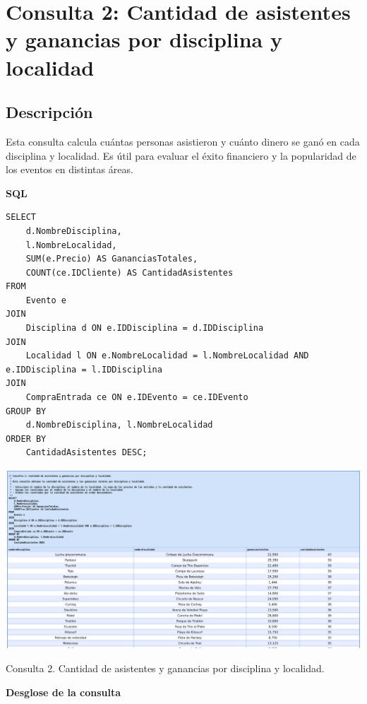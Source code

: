 \section*{Consulta 2: Cantidad de asistentes y ganancias por disciplina y localidad}

\subsection*{Descripción}
Esta consulta calcula cuántas personas asistieron y cuánto dinero se ganó en cada disciplina y localidad. Es útil para evaluar el éxito financiero y la popularidad de los eventos en distintas áreas.

\textbf{SQL}

\begin{verbatim}
SELECT 
    d.NombreDisciplina,
    l.NombreLocalidad,
    SUM(e.Precio) AS GananciasTotales,
    COUNT(ce.IDCliente) AS CantidadAsistentes
FROM 
    Evento e
JOIN 
    Disciplina d ON e.IDDisciplina = d.IDDisciplina
JOIN 
    Localidad l ON e.NombreLocalidad = l.NombreLocalidad AND e.IDDisciplina = l.IDDisciplina
JOIN 
    CompraEntrada ce ON e.IDEvento = ce.IDEvento
GROUP BY 
    d.NombreDisciplina, l.NombreLocalidad
ORDER BY 
    CantidadAsistentes DESC;
\end{verbatim}

\begin{center}
    \includegraphics[width=16.5cm]{resources/Chapters/Consultas/Imagenes/Consulta2.jpeg} 
    
   Consulta 2. Cantidad de asistentes y ganancias por disciplina y localidad. 
\end{center}

\textbf{Desglose de la consulta}

